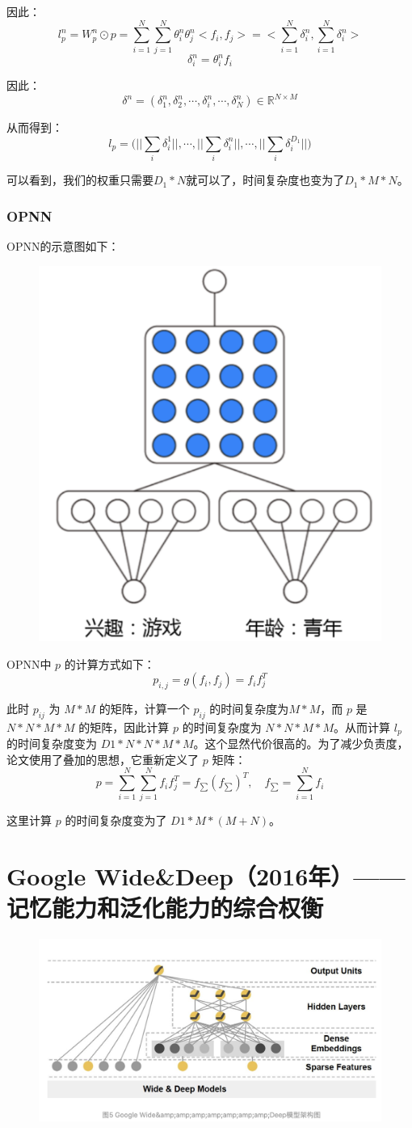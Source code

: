 \documentclass[12pt]{article}
\begin{document}
因此：
$$
l_p^n = W_p^n \odot p = \sum_{i=1}^N\sum_{j=1}^N \theta_i^n \theta_j^n <f_i, f_j> = < \sum_{i=1}^N\delta_i^n, \sum_{i=1}^N\delta_i^n >
$$
$$
\delta_i^n = \theta_i^nf_i
$$

因此：
$$
\delta^n = (\delta_1^n, \delta_2^n, \cdots, \delta_i^n, \cdots, \delta_N^n) \in \mathbb{R}^{N\times M}
$$

从而得到：
$$
l_p = \Big( ||\sum_i\delta_i^1||, \cdots,  ||\sum_i\delta_i^n||, \cdots,  ||\sum_i\delta_i^{D_1}||\Big)
$$

可以看到，我们的权重只需要$D_1 * N$就可以了，时间复杂度也变为了$D_1*M*N$。

\subsubsection{OPNN}
OPNN的示意图如下：
\begin{figure}[H]
    \centering
    \includegraphics[width=.3\textwidth]{fig/DCN_OPNN_Example.png}
\end{figure}

OPNN中 $p$ 的计算方式如下：
$$
p_{i,j} = g(f_i, f_j) = f_if_j^T
$$

此时 $p_{ij}$ 为 $M*M$ 的矩阵，计算一个 $p_{ij}$ 的时间复杂度为$M*M$，而 $p$ 是 $N*N*M*M$ 的矩阵，因此计算 $p$ 的时间复杂度为 $N*N*M*M$。从而计算 $l_p$ 的时间复杂度变为 $D1 * N*N*M*M$。这个显然代价很高的。为了减少负责度，论文使用了叠加的思想，它重新定义了 $p$ 矩阵：
$$
p = \sum_{i=1}^N\sum_{j=1}^Nf_if_j^T = f_{\sum}(f_{\sum})^T, \quad f_{\sum} = \sum_{i=1}^Nf_i
$$

这里计算 $p$ 的时间复杂度变为了 $D1*M*(M+N)$。

\section{Google Wide\&Deep（2016年）——记忆能力和泛化能力的综合权衡}
\begin{figure}[H]
    \centering
    \includegraphics[width=.8\textwidth]{fig/Wide_Deep_Structure.png}
\end{figure}
\end{document}

